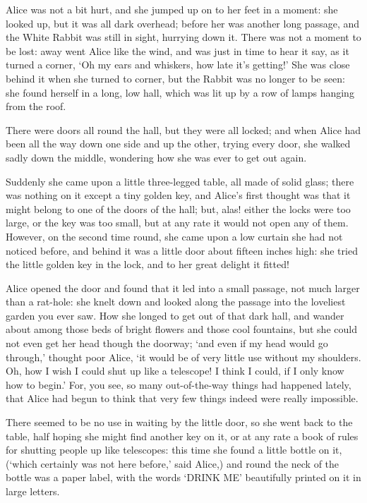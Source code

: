 \documentclass{article}
\begin{document}
Alice was not a bit hurt, and she jumped up on to her feet in a moment: she looked up, but it was all dark overhead; before her was another long passage, and the White Rabbit was still in sight, hurrying down it. There was not a moment to be lost: away went Alice like the wind, and was just in time to hear it say, as it turned a corner, `Oh my ears and whiskers, how late it's getting!' She was close behind it when she turned to corner, but the Rabbit was no longer to be seen: she found herself in a long, low hall, which was lit up by a row of lamps hanging from the roof.

There were doors all round the hall, but they were all locked; and when Alice had been all the way down one side and up the other, trying every door, she walked sadly down the middle, wondering how she was ever to get out again.

Suddenly she came upon a little three-legged table, all made of solid glass; there was nothing on it except a tiny golden key, and Alice's first thought was that it might belong to one of the doors of the hall; but, alas! either the locks were too large, or the key was too small, but at any rate it would not open any of them. However, on the second time round, she came upon a low curtain she had not noticed before, and behind it was a little door about fifteen inches high: she tried the little golden key in the lock, and to her great delight it fitted!

Alice opened the door and found that it led into a small passage, not much larger than a rat-hole: she knelt down and looked along the passage into the loveliest garden you ever saw. How she longed to get out of that dark hall, and wander about among those beds of bright flowers and those cool fountains, but she could not even get her head though the doorway; `and even if my head would go through,' thought poor Alice, `it would be of very little use without my shoulders. Oh, how I wish I could shut up like a telescope! I think I could, if I only know how to begin.' For, you see, so many out-of-the-way things had happened lately, that Alice had begun to think that very few things indeed were really impossible.

There seemed to be no use in waiting by the little door, so she went back to the table, half hoping she might find another key on it, or at any rate a book of rules for shutting people up like telescopes: this time she found a little bottle on it, (`which certainly was not here before,' said Alice,) and round the neck of the bottle was a paper label, with the words `DRINK ME' beautifully printed on it in large letters.
\end{document}
